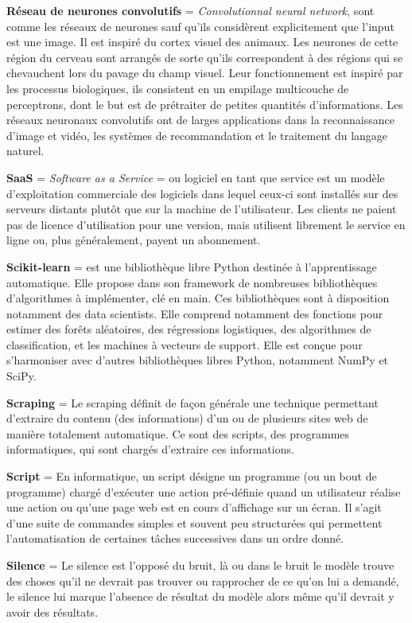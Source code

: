 \textbf{Réseau de neurones convolutifs} = \textit{Convolutionnal neural network}, sont comme les réseaux de neurones sauf qu'ils considèrent explicitement que l'input est une image. Il est inspiré du cortex visuel des animaux. Les neurones de cette région du cerveau sont arrangés de sorte qu'ils correspondent à des régions qui se chevauchent lors du pavage du champ visuel. Leur fonctionnement est inspiré par les processus biologiques, ils consistent en un empilage multicouche de perceptrons, dont le but est de prétraiter de petites quantités d'informations. Les réseaux neuronaux convolutifs ont de larges applications dans la reconnaissance d'image et vidéo, les systèmes de recommandation et le traitement du langage naturel.

\textbf{SaaS} = \textit{Software as a Service} = ou logiciel en tant que service est un modèle d'exploitation commerciale des logiciels dans lequel ceux-ci sont installés sur des serveurs distants plutôt que sur la machine de l'utilisateur. Les clients ne paient pas de licence d'utilisation pour une version, mais utilisent librement le service en ligne ou, plus généralement, payent un abonnement.

\textbf{Scikit-learn} = est une bibliothèque libre Python destinée à l'apprentissage automatique. Elle propose dans son framework de nombreuses bibliothèques d’algorithmes à implémenter, clé en main. Ces bibliothèques sont à disposition notamment des data scientists. Elle comprend notamment des fonctions pour estimer des forêts aléatoires, des régressions logistiques, des algorithmes de classification, et les machines à vecteurs de support. Elle est conçue pour s'harmoniser avec d'autres bibliothèques libres Python, notamment NumPy et SciPy.

\textbf{Scraping} = Le scraping définit de façon générale une technique permettant d'extraire du contenu (des informations) d'un ou de plusieurs sites web de manière totalement automatique. Ce sont des scripts, des programmes informatiques, qui sont chargés d'extraire ces informations.

\textbf{Script} = En informatique, un script désigne un programme (ou un bout de programme) chargé d'exécuter une action pré-définie quand un utilisateur réalise une action ou qu'une page web est en cours d'affichage sur un écran. Il s'agit d'une suite de commandes simples et souvent peu structurées qui permettent l'automatisation de certaines tâches successives dans un ordre donné.

\textbf{Silence} = Le silence est l'opposé du bruit, là ou dans le bruit le modèle trouve des choses qu'il ne devrait pas trouver ou rapprocher de ce qu'on lui a demandé, le silence lui marque l'absence de résultat du modèle alors même qu'il devrait y avoir des résultats.

